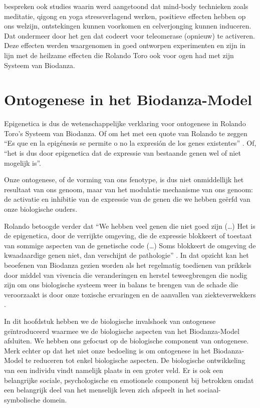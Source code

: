 \documentclass[
  11pt,
]{book}
\begin{document}
\citet{BlackburnEpel2017} bespreken ook studies waarin werd aangetoond dat mind-body technieken zoals meditatie, qigong en yoga stressverlagend werken, positieve effecten hebben op ons welzijn, ontstekingen kunnen voorkomen en celverjonging kunnen induceren. Dat ondermeer door het gen dat codeert voor teleomerase (opnieuw) te activeren. Deze effecten werden waargenomen in goed ontworpen experimenten en zijn in lijn met de heilzame effecten die Rolando Toro ook voor ogen had met zijn Systeem van Biodanza.

\hypertarget{ontogenese-in-het-biodanza-model}{%
\section{Ontogenese in het Biodanza-Model}\label{ontogenese-in-het-biodanza-model}}

Epigenetica is dus de wetenschappelijke verklaring voor ontogenese in Rolando Toro's Systeem van Biodanza. Of om het met een quote van Rolando te zeggen ``Es que en la epigénesis
se permite o no la expresión de los genes existentes'' \citep{Montanari2023}. Of, ``het is dus door epigenetica dat de expressie van bestaande genen wel of niet mogelijk is''.

Onze ontogenese, of de vorming van ons fenotype, is dus niet onmiddellijk het resultaat van ons genoom, maar van het modulatie mechanisme van ons genoom: de activatie en inhibitie van de expressie van de genen die we hebben geërfd van onze biologische ouders.

Rolando betoogde verder dat ``We hebben veel genen die niet goed zijn (\ldots) Het is de epigenetica, door de verrijkte omgeving, die de expressie blokkeert of toestaat van sommige aspecten van de genetische code (\ldots) Soms blokkeert de omgeving de kwaadaardige genen niet, dan verschijnt de pathologie'' \citep{Montanari2023}. In dat opzicht kan het beoefenen van Biodanza gezien worden als het regelmatig toedienen van prikkels door middel van vivencia die veranderingen en herstel teweegbrengen die nodig zijn om ons biologische systeem weer in balans te brengen van de schade die veroorzaakt is door onze toxische ervaringen en de aanvallen van ziekteverwekkers \citep{Montanari2023}.

In dit hoofdstuk hebben we de biologische invalshoek van ontogenese geïntroduceerd waarmee we de biologische aspecten van het Biodanza-Model afsluiten. We hebben ons gefocust op de biologische component van ontogenese. Merk echter op dat het niet onze bedoeling is om ontogenese in het Biodanza-Model te reduceren tot enkel biologische aspecten. De biologische ontwikkeling van een individu vindt namelijk plaats in een groter veld. Er is ook een belangrijke sociale, psychologische en emotionele component bij betrokken omdat een belangrijk deel van het menselijk leven zich afspeelt in het sociaal-symbolische domein.
\end{document}
